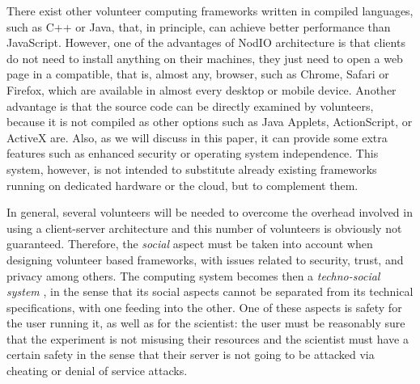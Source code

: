 \documentclass{sig-alternate}
\begin{document}
There exist other volunteer computing frameworks written in compiled languages,
such as C++ or Java, that, in principle, can achieve better performance than
JavaScript. However, one of the advantages of {\sf NodIO} architecture is that
clients do not need to install anything on their machines, they just
need to open a web page  
in a compatible, that is, almost any, browser, such as Chrome, Safari or  Firefox, which are
available in almost every desktop or mobile device. Another advantage is
that the source code can be directly examined by volunteers, because it is not
compiled as other options such as Java Applets, ActionScript, or
ActiveX are. Also, as we will discuss in this paper, it can provide some extra
features such as enhanced security or operating system
independence. This system, however, is not intended to substitute
already existing frameworks running on dedicated hardware or the cloud, but to
complement them. 


In general, several volunteers will be needed to
overcome the overhead involved in using a client-server architecture
and this number of volunteers is obviously not guaranteed. Therefore, the {\em social} aspect must be taken into account when designing 
volunteer based frameworks, with 
issues related to security, trust, and privacy among others. 
The computing system becomes then a {\em techno-social system}
\cite{vespignani2009predicting}, in the sense that its social aspects
cannot be separated from its technical specifications, with one
feeding into the other. One of these aspects is safety for the user
running it, as well as for the scientist: the user must be reasonably
sure that the 
experiment is not misusing their resources and the scientist must have a
certain safety in the sense that their server is not going to be
attacked via cheating or denial of service attacks. 
\end{document}
